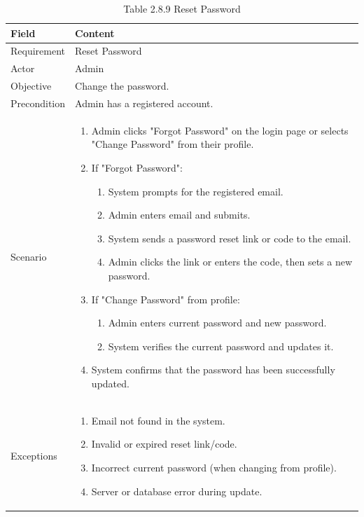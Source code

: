 \documentclass[12pt,oneside]{report}
\begin{document}
\begin{table}[H]
\centering
\caption{Table 2.8.9 Reset Password}
\label{tab:admin-reset-password}
\begin{tabularx}{\textwidth}{|p{3cm}|X|}
\hline
\textbf{Field} & \textbf{Content} \\ \hline

Requirement & Reset Password \\ \hline

Actor & Admin \\ \hline

Objective & Change the password. \\ \hline

Precondition & Admin has a registered account. \\ \hline

Scenario &
\begin{minipage}[t]{0.75\textwidth}
\begin{enumerate}[leftmargin=*,label=\arabic*.]
\item Admin clicks "Forgot Password" on the login page or selects "Change Password" from their profile.
\item If "Forgot Password":
    \begin{enumerate}[label*=\arabic*.]
    \item System prompts for the registered email.
    \item Admin enters email and submits.
    \item System sends a password reset link or code to the email.
    \item Admin clicks the link or enters the code, then sets a new password.
    \end{enumerate}
\item If "Change Password" from profile:
    \begin{enumerate}[label*=\arabic*.]
    \item Admin enters current password and new password.
    \item System verifies the current password and updates it.
    \end{enumerate}
\item System confirms that the password has been successfully updated.
\end{enumerate}
\end{minipage} \\ \hline

Exceptions &
\begin{minipage}[t]{0.75\textwidth}
\begin{enumerate}[leftmargin=*,label=\arabic*.]
\item Email not found in the system.
\item Invalid or expired reset link/code.
\item Incorrect current password (when changing from profile).
\item Server or database error during update.
\end{enumerate}
\end{minipage} \\ \hline


\end{tabularx}
\end{table}
\end{document}
